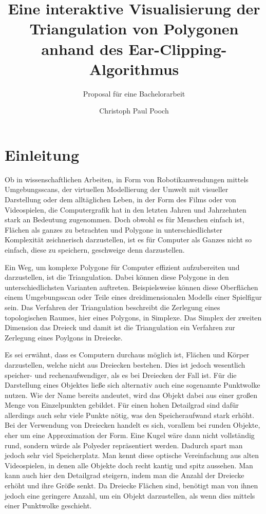 \documentclass[11pt]{article}
\title{\textbf{Eine interaktive Visualisierung der Triangulation von Polygonen anhand des Ear-Clipping-Algorithmus}}
\subtitle{Proposal für eine Bachelorarbeit}
\author{Christoph Paul Pooch}
\begin{document}
    \maketitle

\section*{Einleitung}
Ob in wissenschaftlichen Arbeiten, in Form von Robotikanwendungen mittels Umgebungsscans, der virtuellen Modellierung der Umwelt mit visueller Darstellung oder dem
alltäglichen Leben, in der Form des Films oder von Videospielen, die Computergrafik hat in den letzten Jahren und Jahrzehnten stark an Bedeutung zugenommen. Doch obwohl es für Menschen einfach ist, Flächen als ganzes zu betrachten und Polygone in unterschiedlichster Komplexität zeichnerisch darzustellen,
ist es für Computer als Ganzes nicht so einfach, diese zu speichern, geschweige denn darzustellen.

Ein Weg, um komplexe Polygone für Computer effizient aufzubereiten und darzustellen, ist die Triangulation. 
Dabei können diese Polygone in den unterschiedlichsten Varianten auftreten. Beispielsweise können diese Oberflächen einem Umgebungsscan oder Teile eines dreidimensionalen Modells einer Spielfigur sein.
Das Verfahren der Triangulation beschreibt die Zerlegung eines topologischen Raumes, hier eines Polygons, in Simplexe.
Das Simplex der zweiten Dimension das Dreieck und damit ist die Triangulation ein Verfahren zur Zerlegung eines Poylgons in Dreiecke.

Es sei erwähnt, dass es Computern durchaus möglich ist, Flächen und Körper darzustellen, welche nicht aus Dreiecken bestehen. Dies ist jedoch wesentlich speicher- 
und rechenaufwendiger, als es bei Dreiecken der Fall ist. Für die Darstellung eines Objektes ließe sich alternativ auch eine sogenannte Punktwolke nutzen.
Wie der Name bereits andeutet, wird das Objekt dabei aus einer großen Menge von Einzelpunkten gebildet. Für einen hohen Detailgrad sind dafür allerdings auch sehr viele Punkte nötig, was den Speicheraufwand stark erhöht.
Bei der Verwendung von Dreiecken handelt es sich, vorallem bei runden Objekte, eher um eine Approximation der Form. Eine Kugel wäre dann nicht vollständig rund, sondern würde als Polyeder repräsentiert werden. Dadurch spart man jedoch 
sehr viel Speicherplatz. Man kennt diese optische Vereinfachung aus alten Videospielen, in denen alle Objekte doch recht kantig und spitz aussehen. Man kann auch hier den Detailgrad steigern, indem man die Anzahl der Dreiecke erhöht und ihre Größe senkt.
Da Dreiecke Flächen sind, benötigt man von ihnen jedoch eine geringere Anzahl, um ein Objekt darzustellen, als wenn dies mittels einer Punktwolke geschieht. \break
\end{document}

